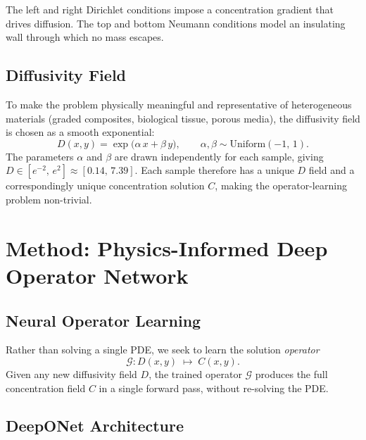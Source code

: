 \documentclass[11pt]{article}
\begin{document}
The left and right Dirichlet conditions impose a concentration gradient that
drives diffusion.  The top and bottom Neumann conditions model an insulating
wall through which no mass escapes.

\subsection{Diffusivity Field}

To make the problem physically meaningful and representative of heterogeneous
materials (graded composites, biological tissue, porous media), the
diffusivity field is chosen as a smooth exponential:
\begin{equation}
  D(x,y) = \exp\!\bigl(\alpha\, x + \beta\, y\bigr),
  \qquad \alpha,\beta \sim \mathrm{Uniform}(-1,\,1).
\end{equation}
The parameters $\alpha$ and $\beta$ are drawn independently for each sample,
giving $D \in [e^{-2},\, e^{2}] \approx [0.14,\, 7.39]$.  Each sample
therefore has a unique $D$ field and a correspondingly unique concentration
solution $C$, making the operator-learning problem non-trivial.

\section{Method: Physics-Informed Deep Operator Network}

\subsection{Neural Operator Learning}

Rather than solving a single PDE, we seek to learn the solution
\emph{operator}
\begin{equation}
  \mathcal{G} : D(x,y) \;\longmapsto\; C(x,y).
  \label{eq:operator}
\end{equation}
Given any new diffusivity field $D$, the trained operator $\mathcal{G}$
produces the full concentration field $C$ in a single forward pass, without
re-solving the PDE.

\subsection{DeepONet Architecture}
\end{document}
